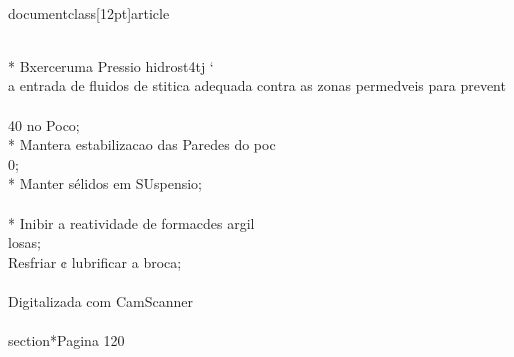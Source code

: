 \\documentclass[12pt]{article}
\begin{document}
\\
* Bxerceruma Pressio hidrost4tj ‘\\
a entrada de fluidos de stitica adequada contra as zonas permedveis para prevent\\
\\
40 no Poco;\\
* Mantera estabilizacao das Paredes do poc\\
0;\\
* Manter sélidos em SUspensio;\\
\\
* Inibir a reatividade de formacdes argil\\
losas;\\
Resfriar ¢ lubrificar a broca;\\
\\
Digitalizada com CamScanner\\

\\section*{Pagina 120}
\end{document}
